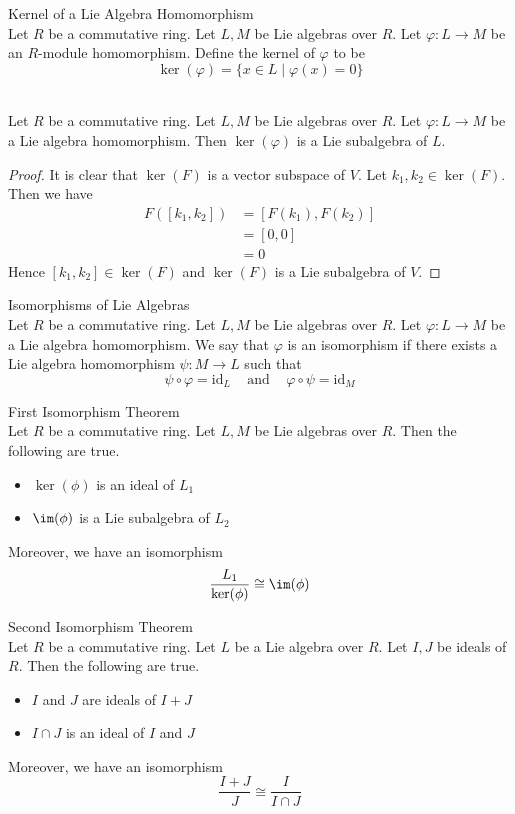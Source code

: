 \documentclass[a4paper]{article}
\begin{document}
\begin{defn}{Kernel of a Lie Algebra Homomorphism}{}\\
Let $R$ be a commutative ring. Let $L,M$ be Lie algebras over $R$. Let $\varphi:L\to M$ be an $R$-module homomorphism. Define the kernel of $\varphi$ to be $$\ker(\varphi)=\{x\in L\;|\;\varphi(x)=0\}$$
\end{defn}

\begin{lmm}{}{}\\
Let $R$ be a commutative ring. Let $L,M$ be Lie algebras over $R$. Let $\varphi:L\to M$ be a Lie algebra homomorphism. Then $\ker(\varphi)$ is a Lie subalgebra of $L$. 
\begin{proof}
It is clear that $\ker(F)$ is a vector subspace of $V$. Let $k_1,k_2\in\ker(F)$. Then we have 
\begin{align*}
F([k_1,k_2])&=[F(k_1),F(k_2)]\tag{$F$ is a Lie algebra homomorphism}\\
&=[0,0]\\
&=0
\end{align*}
Hence $[k_1,k_2]\in\ker(F)$ and $\ker(F)$ is a Lie subalgebra of $V$. 
\end{proof}
\end{lmm}

\begin{defn}{Isomorphisms of Lie Algebras}{}\\
Let $R$ be a commutative ring. Let $L,M$ be Lie algebras over $R$. Let $\varphi:L\to M$ be a Lie algebra homomorphism. We say that $\varphi$ is an isomorphism if there exists a Lie algebra homomorphism $\psi:M\to L$ such that $$\psi\circ\varphi=\text{id}_L\;\;\;\text{ and }\;\;\;\varphi\circ\psi=\text{id}_M$$
\end{defn}

\begin{thm}{First Isomorphism Theorem}{}\\
Let $R$ be a commutative ring. Let $L,M$ be Lie algebras over $R$. Then the following are true. 
\begin{itemize}
\item $\ker(\phi)$ is an ideal of $L_1$
\item $\im(\phi)$ is a Lie subalgebra of $L_2$
\end{itemize}
Moreover, we have an isomorphism $$\frac{L_1}{\ker(\phi)}\cong\im(\phi)$$
\end{thm}

\begin{thm}{Second Isomorphism Theorem}{}\\
Let $R$ be a commutative ring. Let $L$ be a Lie algebra over $R$. Let $I,J$ be ideals of $R$. Then the following are true. 
\begin{itemize}
\item $I$ and $J$ are ideals of $I+J$
\item $I\cap J$ is an ideal of $I$ and $J$
\end{itemize}
Moreover, we have an isomorphism $$\frac{I+J}{J}\cong\frac{I}{I\cap J}$$
\end{thm}
\end{document}
